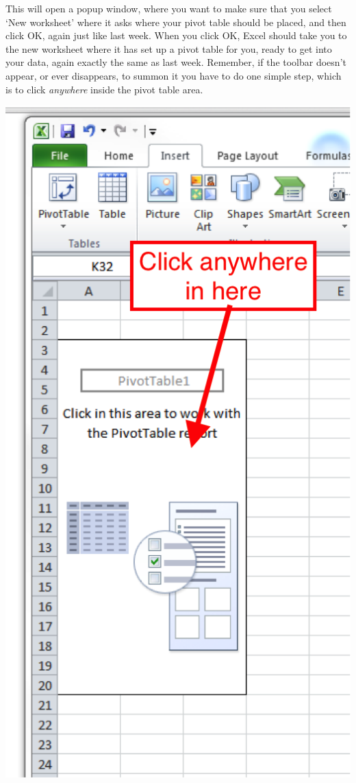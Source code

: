 \documentclass[
]{book}
\begin{document}
This will open a popup window, where you want to make sure that you select `New worksheet' where it asks where your pivot table should be placed, and then click OK, again just like last week. When you click OK, Excel should take you to the new worksheet where it has set up a pivot table for you, ready to get into your data, again exactly the same as last week. Remember, if the toolbar doesn't appear, or ever disappears, to summon it you have to do one simple step, which is to click \emph{anywhere} inside the pivot table area.

\includegraphics{imgs/pivot_shell.png}
\end{document}
